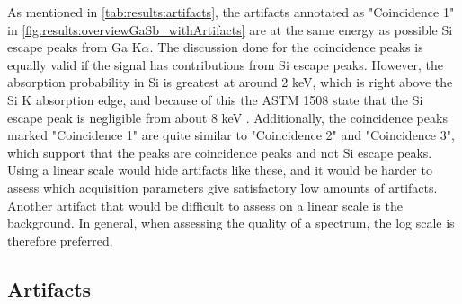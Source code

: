 As mentioned in \cref{tab:results:artifacts}, the artifacts annotated as "Coincidence 1" in \cref{fig:results:overviewGaSb_withArtifacts} are at the same energy as possible Si escape peaks from Ga K$\alpha$.
The discussion done for the coincidence peaks is equally valid if the signal has contributions from Si escape peaks.
However, the absorption probability in Si is greatest at around 2 keV, which is right above the Si K absorption edge, and because of this the ASTM 1508 state that the Si escape peak is negligible from about 8 keV \cite[8.3.2]{astm_e1508_eds_quantification}.
Additionally, the coincidence peaks marked "Coincidence 1" are quite similar to "Coincidence 2" and "Coincidence 3", which support that the peaks are coincidence peaks and not Si escape peaks.
Using a linear scale would hide artifacts like these, and it would be harder to assess which acquisition parameters give satisfactory low amounts of artifacts.
Another artifact that would be difficult to assess on a linear scale is the background.
In general, when assessing the quality of a spectrum, the log scale is therefore preferred.




\subsection{Artifacts}
\label{discussion:artifacts}

